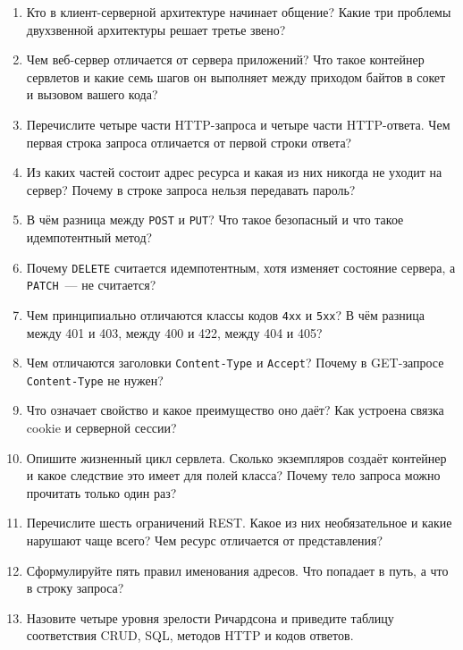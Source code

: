 \begin{enumerate}
\item Кто в клиент-серверной архитектуре начинает общение? Какие три проблемы
      двухзвенной архитектуры решает третье звено?
\item Чем веб-сервер отличается от сервера приложений? Что такое контейнер
      сервлетов и какие семь шагов он выполняет между приходом байтов в сокет и
      вызовом вашего кода?
\item Перечислите четыре части HTTP-запроса и четыре части HTTP-ответа. Чем
      первая строка запроса отличается от первой строки ответа?
\item Из каких частей состоит адрес ресурса и какая из них никогда не уходит на
      сервер? Почему в строке запроса нельзя передавать пароль?
\item В чём разница между \texttt{POST} и \texttt{PUT}? Что такое безопасный и
      что такое идемпотентный метод?
\item Почему \texttt{DELETE} считается идемпотентным, хотя изменяет состояние
      сервера, а \texttt{PATCH}~--- не считается?
\item Чем принципиально отличаются классы кодов \texttt{4xx} и \texttt{5xx}? В
      чём разница между 401 и 403, между 400 и 422, между 404 и 405?
\item Чем отличаются заголовки \texttt{Content-Type} и \texttt{Accept}? Почему
      в GET-запросе \texttt{Content-Type} не нужен?
\item Что означает свойство  и какое преимущество оно даёт? Как
      устроена связка cookie и серверной сессии?
\item Опишите жизненный цикл сервлета. Сколько экземпляров создаёт контейнер и
      какое следствие это имеет для полей класса? Почему тело запроса можно
      прочитать только один раз?
\item Перечислите шесть ограничений REST. Какое из них необязательное и какие
      нарушают чаще всего? Чем ресурс отличается от представления?
\item Сформулируйте пять правил именования адресов. Что попадает в путь, а что
      в строку запроса?
\item Назовите четыре уровня зрелости Ричардсона и приведите таблицу
      соответствия CRUD, SQL, методов HTTP и кодов ответов.
\end{enumerate}

\testzadaniya

